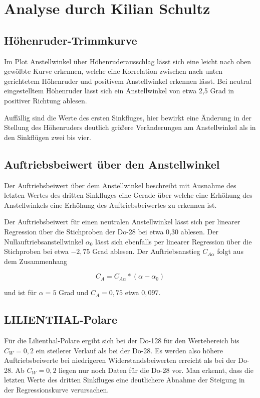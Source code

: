 \documentclass[11pt]{scrartcl}
\begin{document}
\section{Analyse durch Kilian Schultz}
	\subsection{Höhenruder-Trimmkurve}
	
Im Plot Anstellwinkel über Höhenruderausschlag lässt sich eine leicht nach oben gewölbte Kurve erkennen, welche eine Korrelation zwischen nach unten gerichtetem Höhenruder und positivem Anstellwinkel erkennen lässt. Bei neutral eingestelltem Höhenruder lässt sich ein Anstellwinkel von etwa 2,5 Grad in positiver Richtung ablesen.

Auffällig sind die Werte des ersten Sinkfluges, hier bewirkt eine Änderung in der Stellung des Höhenruders deutlich größere Veränderungen am Anstellwinkel als in den Sinkflügen zwei bis vier.	
	
	\subsection{Auftriebsbeiwert über den Anstellwinkel}
	
Der Auftriebsbeiwert über dem Anstellwinkel beschreibt mit Ausnahme des letzten Wertes des dritten Sinkfluges eine Gerade über welche eine Erhöhung des Anstellwinkels eine Erhöhung des Auftriebsbeiwertes zu erkennen ist.

Der Auftriebsbeiwert für einen neutralen Anstellwinkel lässt sich per linearer Regression über die Stichproben der Do-28 bei etwa 0,30 ablesen.
Der Nullauftriebsanstellwinkel $\alpha_{0}$ lässt sich ebenfalls per linearer Regression über die Stichproben bei etwa $-2,75$ Grad ablesen.
Der Auftriebsanstieg $C_{A\alpha}$ folgt aus dem Zusammenhang

\begin{equation*}
  C_{A} = C_{A\alpha} * (\alpha-\alpha_{0})
\end{equation*}


und ist für $\alpha = 5$ Grad und $C_{A} = 0,75$ etwa $0,097$.
	
	\subsection{LILIENTHAL-Polare}
	
Für die Lilienthal-Polare ergibt sich bei der Do-128 für den Wertebereich bis $C_{W} = 0,2$ ein steilerer Verlauf als bei der Do-28. Es werden also höhere Auftriebsbeiwerte bei niedrigeren Widerstandsbeiwerten erreicht als bei der Do-28.
Ab $C_{W} = 0,2$ liegen nur noch Daten für die Do-28 vor. Man erkennt, dass die letzten Werte des dritten Sinkfluges eine deutlichere Abnahme der Steigung in der Regressionskurve verursachen.
\end{document}
